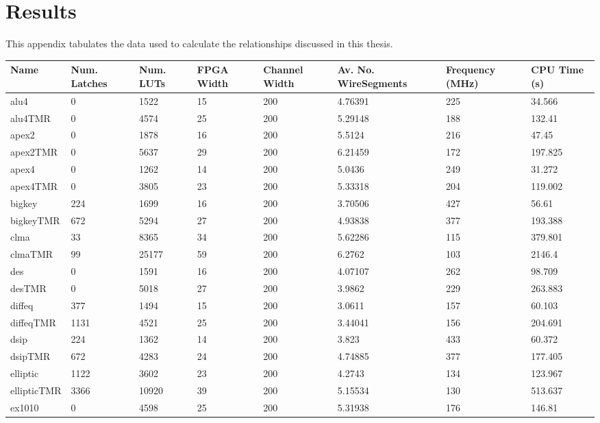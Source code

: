 \documentclass[12pt,final,oneside]{dwThesis} %
\begin{document}
\chapter{Results}
This appendix tabulates the data used to calculate the relationships discussed in this thesis.
\begin{table}
\footnotesize
\begin{adjustwidth}{-1cm}{-1.2cm}
    \begin{tabularx}{1.1\textwidth}{llllp{1.5cm}p{2.2cm}p{1.5cm}X}
    \toprule
Name & Num. Latches & Num. LUTs & FPGA Width & Channel Width & Av. No. Wire\newline Segments & Frequency (MHz) & CPU Time (s)\\\midrule
alu4 & 0 & 1522 & 15 & 200 & 4.76391 &225 & 34.566\\
alu4TMR & 0 & 4574 & 25 & 200 & 5.29148 &188 & 132.41\\\midrule
apex2 & 0 & 1878 & 16 & 200 & 5.5124 &216 & 47.45\\
apex2TMR & 0 & 5637 & 29 & 200 & 6.21459 &172 & 197.825\\\midrule
apex4 & 0 & 1262 & 14 & 200 & 5.0436 &249 & 31.272\\
apex4TMR & 0 & 3805 & 23 & 200 & 5.33318 &204 & 119.002\\\midrule
bigkey & 224 & 1699 & 16 & 200 & 3.70506 &427 & 56.61\\
bigkeyTMR & 672 & 5294 & 27 & 200 & 4.93838 &377 & 193.388\\\midrule
clma & 33 & 8365 & 34 & 200 & 5.62286 &115 & 379.801\\
clmaTMR & 99 & 25177 & 59 & 200 & 6.2762 &103 & 2146.4\\\midrule
des & 0 & 1591 & 16 & 200 & 4.07107 &262 & 98.709\\
desTMR & 0 & 5018 & 27 & 200 & 3.9862 &229 & 263.883\\\midrule
diffeq & 377 & 1494 & 15 & 200 & 3.0611 &157 & 60.103\\
diffeqTMR & 1131 & 4521 & 25 & 200 & 3.44041 &156 & 204.691\\\midrule
dsip & 224 & 1362 & 14 & 200 & 3.823 &433 & 60.372\\
dsipTMR & 672 & 4283 & 24 & 200 & 4.74885 &377 & 177.405\\\midrule
elliptic & 1122 & 3602 & 23 & 200 & 4.2743 &134 & 123.967\\
ellipticTMR & 3366 & 10920 & 39 & 200 & 5.15534 &130 & 513.637\\\midrule
ex1010 & 0 & 4598 & 25 & 200 & 5.31938 &176 & 146.81\\

\end{tabularx}
\end{adjustwidth}
\end{table}
\end{document}

